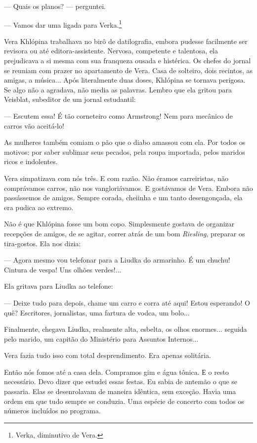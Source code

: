 --- Quais os planos? --- perguntei.

--- Vamos dar uma ligada para Verka.\footnote{Verka, diminutivo de Vera.}

Vera Khlópina trabalhava no birô de datilografia, embora pudesse
facilmente ser revisora ou até editora-assistente. Nervosa, competente e
talentosa, ela prejudicava a si mesma com sua franqueza ousada e
histérica. Os chefes do jornal se reuniam com prazer no apartamento de
Vera. Casa de solteiro, dois recintos, as amigas, a música... Após
literalmente duas doses, Khlópina se tornava perigosa. Se algo não a
agradava, não media as palavras. Lembro que ela gritou para Veisblat,
subeditor de um jornal estudantil:

--- Escutem essa! É tão corneteiro como Armstrong! Nem para mecânico de
carros vão aceitá-lo!

As mulheres também comiam o pão que o diabo amassou com ela. Por todos
os motivos: por saber sublimar seus pecados, pela roupa importada, pelos
maridos ricos e indolentes.

Vera simpatizava com nós três. E com razão. Não éramos carreiristas, não
comprávamos carros, não nos vangloriávamos. E gostávamos de Vera. Embora
não passássemos de amigos. Sempre corada, cheiinha e um tanto
desengonçada, ela era pudica ao extremo.

Não é que Khlópina fosse um bom copo. Simplesmente gostava de organizar
recepções de amigos, de se agitar, correr atrás de um bom
\emph{Riesling}, preparar os tira-gostos. Ela nos dizia:

--- Agora mesmo vou telefonar para a Liudka do armarinho. É um chuchu!
Cintura de vespa! Uns olhões verdes!...

Ela gritava para Liudka ao telefone:

--- Deixe tudo para depois, chame um carro e corra até aqui! Estou
esperando! O quê? Escritores, jornalistas, uma fartura de vodca, um
bolo...

Finalmente, chegava Liudka, realmente alta, esbelta, os olhos enormes...
seguida pelo marido, um capitão do Ministério para Assuntos Internos...

Vera fazia tudo isso com total desprendimento. Era apenas solitária.

Então nós fomos até a casa dela. Compramos gim e água tônica. Е o resto
necessário. Devo dizer que estudei essas festas. Eu sabia de antemão o
que se passaria. Elas se desenrolavam de maneira idêntica, sem exceção.
Havia uma ordem em que tudo sempre se conduzia. Uma espécie de concerto
com todos os números incluídos no programa.

